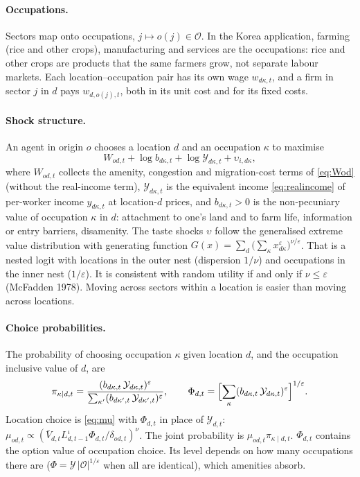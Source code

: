 \documentclass[11pt]{article}
\begin{document}
\paragraph{Occupations.} Sectors map onto occupations, $j\mapsto o(j)\in\mathcal{O}$. In the
Korea application, farming (rice and other crops), manufacturing and services are the
occupations: rice and other crops are products that the same farmers grow, not separate labour
markets. Each location--occupation pair has its own wage $w_{d\kappa,t}$, and a firm in sector
$j$ in $d$ pays $w_{d,o(j),t}$, both in its unit cost and for its fixed costs.

\paragraph{Shock structure.} An agent in origin $o$ chooses a location $d$ and an occupation
$\kappa$ to maximise
\begin{equation}
  W_{od,t}+\log b_{d\kappa,t}+\log\mathcal{Y}_{d\kappa,t}+\upsilon_{i,d\kappa},
\end{equation}
where $W_{od,t}$ collects the amenity, congestion and migration-cost terms of \eqref{eq:Wod}
(without the real-income term), $\mathcal{Y}_{d\kappa,t}$ is the equivalent income
\eqref{eq:realincome} of per-worker income $y_{d\kappa,t}$ at location-$d$ prices, and
$b_{d\kappa,t}>0$ is the non-pecuniary value of occupation $\kappa$ in $d$: attachment to
one's land and to farm life, information or entry barriers, disamenity. The taste shocks
$\upsilon$ follow the generalised extreme value distribution with generating function
$G(x)=\sum_{d}\bigl(\sum_{\kappa}x_{d\kappa}^{\varepsilon}\bigr)^{\nu/\varepsilon}$. That is a
nested logit with locations in the outer nest (dispersion $1/\nu$) and occupations in the inner
nest ($1/\varepsilon$). It is consistent with random utility if and only if
$\nu\le\varepsilon$ (McFadden 1978). Moving across sectors within a location is easier than
moving across locations.

\paragraph{Choice probabilities.} The probability of choosing occupation $\kappa$ given location
$d$, and the occupation inclusive value of $d$, are
\begin{equation}
  \pi_{\kappa\mid d,t}=\frac{(b_{d\kappa,t}\,\mathcal{Y}_{d\kappa,t})^{\varepsilon}}
  {\sum_{\kappa'}(b_{d\kappa',t}\,\mathcal{Y}_{d\kappa',t})^{\varepsilon}},
  \qquad
  \Phi_{d,t}=\Bigl[\sum_{\kappa}(b_{d\kappa,t}\,\mathcal{Y}_{d\kappa,t})^{\varepsilon}\Bigr]^{1/\varepsilon}.
  \label{eq:occshare}
\end{equation}
Location choice is \eqref{eq:mu} with $\Phi_{d,t}$ in place of $\mathcal{Y}_{d,t}$:
$\mu_{od,t}\propto(\bar V_{d,t}L_{d,t-1}^{\iota}\Phi_{d,t}/\delta_{od,t})^{\nu}$. The joint
probability is $\mu_{od,t}\pi_{\kappa\mid d,t}$. $\Phi_{d,t}$ contains the option value of
occupation choice. Its level depends on how many occupations there are
($\Phi=\mathcal{Y}\,|\mathcal{O}|^{1/\varepsilon}$ when all are identical), which amenities
absorb.
\end{document}
